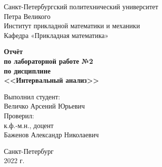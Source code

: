 \thispagestyle{empty}

\begin{center}
\large
Санкт-Петербургский политехнический университет\\
Петра Великого\\
Институт прикладной математики и механики\\
Кафедра «Прикладная математика»\\
\end{center}

\vspace{8em}

\begin{center}
\bfseries
Отчёт\\
по лабораторной работе №2\\
по дисциплине\\
<<Интервальный анализ>>\\
\end{center}

\vspace{8em}

\begin{flushright}
Выполнил студент:\\
Величко Арсений Юрьевич\\
\vspace{2em}
Проверил:\\
к.ф.-м.н., доцент\\
Баженов Александр Николаевич\\
\end{flushright}

\vfill

\begin{center}
Санкт-Петербург\\
2022 г.\\
\end{center}
\newpage